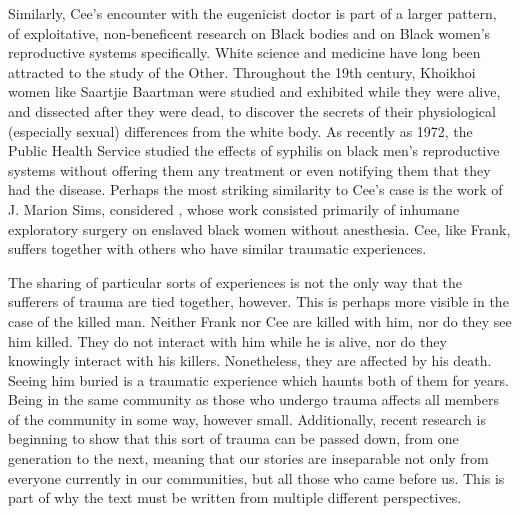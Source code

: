 \documentclass[12pt]{article}
\begin{document}
Similarly, Cee's encounter with the eugenicist doctor is part of a larger
pattern, of exploitative, non-beneficent research on Black bodies and on Black
women's reproductive systems specifically. White science and medicine have long
been attracted to the study of the Other. Throughout the 19th century, Khoikhoi
women like Saartjie Baartman were studied and exhibited while they were alive,
and dissected after they were dead, to discover the secrets of their
physiological (especially sexual) differences from the white
body.\autocite{Qureshi04} As recently as 1972, the Public Health Service
studied the effects of syphilis on black men's reproductive systems without
offering them any treatment or even notifying them that they had the disease.
Perhaps the most striking similarity to Cee's case is the work of J. Marion
Sims, considered , whose work consisted
primarily of inhumane exploratory surgery on enslaved black women without
anesthesia.\autocite{Spettel11} Cee, like Frank, suffers together with others
who have similar traumatic experiences.

The sharing of particular sorts of experiences is not the only way that the
sufferers of trauma are tied together, however. This is perhaps more visible in
the case of the killed man. Neither Frank nor Cee are killed with him, nor do
they see him killed. They do not interact with him while he is alive, nor do
they knowingly interact with his killers. Nonetheless, they are affected by his
death. Seeing him buried is a traumatic experience which haunts both of them
for years. Being in the same community as those who undergo trauma affects all
members of the community in some way, however small. Additionally, recent
research is beginning to show that this sort of trauma can be passed down, from
one generation to the next,\autocite{Dias14,Love10} meaning that our stories
are inseparable not only from everyone currently in our communities, but all
those who came before us. This is part of why the text must be written from
multiple different perspectives.
\end{document}
